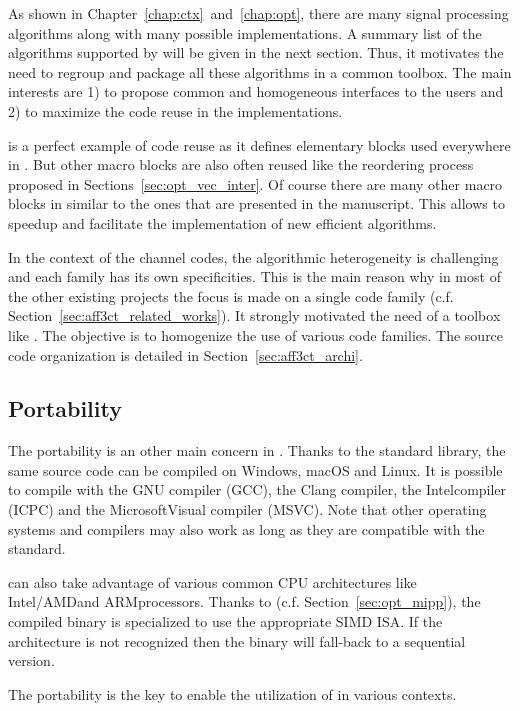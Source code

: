 As shown in Chapter~\ref{chap:ctx}~and~\ref{chap:opt}, there are many signal
processing algorithms along with many possible implementations. A summary list
of the algorithms supported by \AFFECT will be given in the next section. Thus,
it motivates the need to regroup and package all these algorithms in a common
toolbox. The main interests are 1) to propose common and homogeneous interfaces
to the users and 2) to maximize the code reuse in the implementations.

\MIPP is a perfect example of code reuse as it defines elementary blocks used
everywhere in \AFFECT. But other macro blocks are also often reused like the
reordering process proposed in Sections~\ref{sec:opt_vec_inter}. Of course there
are many other macro blocks in \AFFECT similar to the ones that are presented in
the manuscript. This allows to speedup and facilitate the implementation of new
efficient algorithms.

In the context of the channel codes, the algorithmic heterogeneity is
challenging and each family has its own specificities. This is the main reason
why in most of the other existing projects the focus is made on a single code
family (c.f. Section~\ref{sec:aff3ct_related_works}). It strongly motivated
the need of a toolbox like \AFFECT. The objective is to homogenize the use of
various code families. The \AFFECT source code organization is detailed in
Section~\ref{sec:aff3ct_archi}.

\subsection{Portability}

The portability is an other main concern in \AFFECT. Thanks to the 
standard library, the same \AFFECT source code can be compiled on Windows, macOS
and Linux. It is possible to compile with the GNU compiler (GCC), the Clang
compiler, the Intel\R \Cxx compiler (ICPC) and the Microsoft\R Visual compiler
(MSVC). Note that other operating systems and compilers may also work as long as
they are compatible with the  standard.

\AFFECT can also take advantage of various common CPU architectures like
Intel\R/AMD\R and ARM\R processors. Thanks to \MIPP (c.f.
Section~\ref{sec:opt_mipp}), the compiled binary is specialized to use the
appropriate SIMD ISA. If the architecture is not recognized then the \AFFECT
binary will fall-back to a sequential version.

The portability is the key to enable the utilization of \AFFECT in various
contexts.

